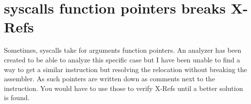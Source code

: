 \documentclass[openany,oneside]{memoir}
\begin{document}
\section{syscalls function pointers breaks X-Refs}
Sometimes, syscalls take for arguments function pointers. An analyzer has been
created to be able to analyze this specific case but I have been unable to find
a way to get a similar instruction but resolving the relocation without breaking
the assembler.
As such pointers are written down as comments next to the instruction. You would
have to use those to verify X-Refs until a better solution is found.
\end{document}
